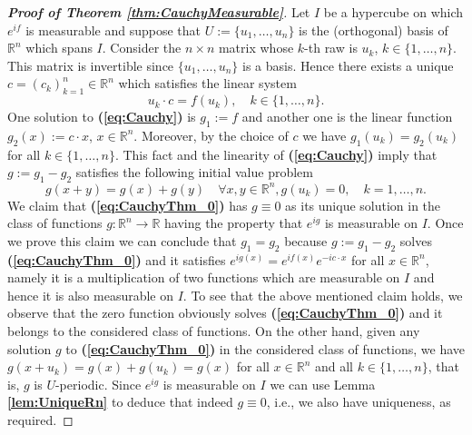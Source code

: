 \documentclass[12 pt]{amsart}
\theoremstyle{definition}
\newcommand{\R}{\mathbb{R}}
\newcommand{\bref}[1]{\textbf{\ref{#1}}} %
\newcommand{\beqref}[1]{\textbf{(\ref{#1})}} %
\begin{document}
\begin{proof}[{\bf Proof of Theorem \bref{thm:CauchyMeasurable}}]
Let $I$ be a hypercube on which $e^{if}$ is measurable and suppose that $U:=\{u_1,\ldots,u_n\}$ is the (orthogonal) basis of $\R^n$ which spans $I$. Consider the $n\times n$ matrix whose $k$-th raw is $u_k$, $k\in\{1,\ldots,n\}$. This matrix is invertible since $\{u_1,\ldots,u_n\}$ is a basis. Hence there exists a unique  $c=(c_k)_{k=1}^n\in \R^n$ which satisfies the linear system 
\begin{equation}\label{eq:uc=f(u)}
u_k\cdot c=f(u_k),\quad k\in\{1,\ldots,n\}.
\end{equation}
One solution to \beqref{eq:Cauchy} is $g_1:=f$ and another one is the linear function 
$g_2(x):=c\cdot x$, $x\in\R^n$. Moreover, by the choice of $c$ we have $g_1(u_k)=g_2(u_k)$ for all $k\in\{1,\ldots,n\}$. This fact and the linearity of \beqref{eq:Cauchy} imply that $g:=g_1-g_2$ satisfies the  following initial value problem 
\begin{subequations}\label{eq:CauchyThm_0}
\begin{equation}\label{eq:CauchyThm_g}
g(x+y)=g(x)+g(y)\quad \forall x,y\in \R^n, 
\end{equation}
\begin{equation}\label{eq:periodThm_g}
g(u_k)=0,\quad k=1,\ldots,n.
\end{equation}
\end{subequations}
 We claim that \beqref{eq:CauchyThm_0} has $g\equiv 0$ as its unique solution in the class of functions $g:\R^n\to\R$ having the property that $e^{ig}$ is measurable on $I$. Once we prove this claim we can conclude that $g_1=g_2$ because $g:=g_1-g_2$ solves \beqref{eq:CauchyThm_0} and it satisfies $e^{ig(x)}=e^{if(x)}e^{-ic\cdot x}$ for all $x\in\R^n$, namely it is a multiplication of two functions which are measurable on $I$ and hence it is also measurable on $I$. To see that the above mentioned claim holds, we observe that the zero function obviously solves  \beqref{eq:CauchyThm_0} and it belongs to the considered class of functions. On the other hand, given any solution $g$ to \beqref{eq:CauchyThm_0} in the considered class of functions, we have $g(x+u_k)=g(x)+g(u_k)=g(x)$ for all $x\in\R^n$ and all $k\in\{1,\ldots,n\}$, that is, $g$ is $U$-periodic. Since $e^{ig}$ is measurable on $I$ we can use Lemma \bref{lem:UniqueRn} to deduce that indeed $g\equiv 0$, i.e., we also have uniqueness, as required.
\end{proof}
\end{document}
